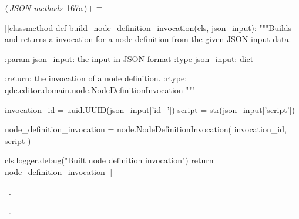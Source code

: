 \documentclass[%
    a4paper,    %
    justified,  %
    nobib,      %
    openany     %
]{tufte-book}
\begin{document}
\begin{flushleft} \small
\begin{minipage}{\linewidth}\label{scrap201}\raggedright\small
{} $\langle\,${\itshape JSON methods}\nobreak\ {\footnotesize {167a}}$\,\rangle+\equiv$
\vspace{-1ex}
\begin{pythoncode}
|\normalfont{}\fontfamily{}|classmethod
def build_node_definition_invocation(cls, json_input):
    """Builds and returns a invocation for a node definition from the given
    JSON input data.

    :param json_input: the input in JSON format
    :type  json_input: dict

    :return: the invocation of a node definition.
    :rtype:  qde.editor.domain.node.NodeDefinitionInvocation
    """

    invocation_id = uuid.UUID(json_input['id_'])
    script        = str(json_input['script'])

    node_definition_invocation = node.NodeDefinitionInvocation(
        invocation_id,
        script
    )

    cls.logger.debug("Built node definition invocation")
    return node_definition_invocation
|\NWsep|
\end{pythoncode}
\vspace{1.5ex}
\footnotesize
\begin{list}{}{\setlength{\itemsep}{-\parsep}\setlength{\itemindent}{-\leftmargin}}
\item \NWtxtMacroDefBy\ .
\item \NWtxtMacroRefIn\ .

\item{}
\end{list}
\end{minipage}\vspace{4ex}
\end{flushleft}
\end{document}
